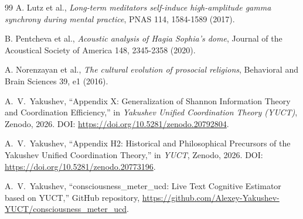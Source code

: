 \documentclass[11pt,a4paper]{article}
\begin{document}
\begin{thebibliography}{99}
		A. Lutz et al., \emph{Long-term meditators self-induce high-amplitude gamma synchrony during mental practice}, PNAS 114, 1584-1589 (2017).
		
		B. Pentcheva et al., \emph{Acoustic analysis of Hagia Sophia's dome}, Journal of the Acoustical Society of America 148, 2345-2358 (2020).
		
		A. Norenzayan et al., \emph{The cultural evolution of prosocial religions}, Behavioral and Brain Sciences 39, e1 (2016).
		
		A.~V.~Yakushev, ``Appendix X: Generalization of Shannon Information Theory and Coordination Efficiency,'' in \emph{Yakushev Unified Coordination Theory (YUCT)}, Zenodo, 2026. DOI: \url{https://doi.org/10.5281/zenodo.20792804}.
		
		A.~V.~Yakushev, ``Appendix H2: Historical and Philosophical Precursors of the Yakushev Unified Coordination Theory,'' in \emph{YUCT}, Zenodo, 2026. DOI: \url{https://doi.org/10.5281/zenodo.20773196}.
		
		A.~V.~Yakushev, ``consciousness\_meter\_ucd: Live Text Cognitive Estimator based on YUCT,'' GitHub repository, \url{https://github.com/Alexey-Yakushev-YUCT/consciousness_meter_ucd}.
		
	\end{thebibliography}
	
\end{document}
